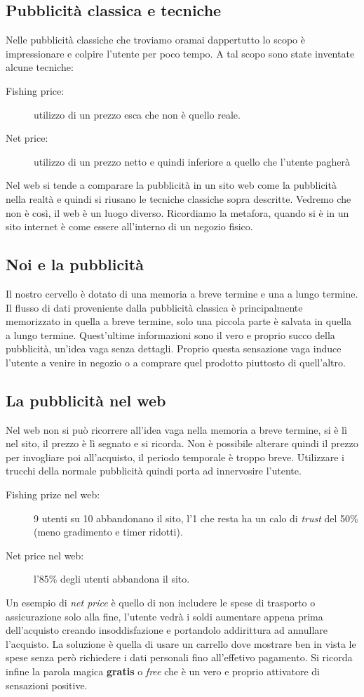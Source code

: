 		\subsection{Pubblicità classica e tecniche}
			Nelle pubblicità classiche che troviamo oramai dappertutto lo scopo è impressionare e colpire l'utente per poco tempo. A tal scopo sono state inventate alcune tecniche:
			\begin{description}
				\item[Fishing price:] utilizzo di un prezzo esca che non è quello reale.
				\item[Net price:] utilizzo di un prezzo netto e quindi inferiore a quello che l'utente pagherà
			\end{description}
			Nel web si tende a comparare la pubblicità in un sito web come la pubblicità nella realtà e quindi si riusano le tecniche classiche sopra descritte. Vedremo che non è così, il web è un luogo diverso. Ricordiamo la metafora, quando si è in un sito internet è come essere all'interno di un negozio fisico.
		
		\subsection{Noi e la pubblicità}
			Il nostro cervello è dotato di una memoria a breve termine e una a lungo termine. Il flusso di dati proveniente dalla pubblicità classica è principalmente memorizzato in quella a breve termine, solo una piccola parte è salvata in quella a lungo termine. Quest'ultime informazioni sono il vero e proprio succo della pubblicità, un'idea vaga senza dettagli. Proprio questa sensazione vaga induce l'utente a venire in negozio o a comprare quel prodotto piuttosto di quell'altro.
		
		\subsection{La pubblicità nel web}
			Nel web non si può ricorrere all'idea vaga nella memoria a breve termine, si è lì nel sito, il prezzo è lì segnato e si ricorda. Non è possibile alterare quindi il prezzo per invogliare poi all'acquisto, il periodo temporale è troppo breve. Utilizzare i trucchi della normale pubblicità 		 quindi porta ad innervosire l'utente.
			\begin{description}
				\item[Fishing prize nel web:] 9 utenti su 10 abbandonano il sito, l'1 che resta ha un calo di \emph{trust} del 50\% (meno gradimento e timer ridotti).
				\item[Net price nel web:] l'85\% degli utenti abbandona il sito. 
			\end{description}
			Un esempio di \emph{net price} è quello di non includere le spese di trasporto o assicurazione solo alla fine, l'utente vedrà i soldi aumentare appena prima dell'acquisto creando insoddisfazione e portandolo addirittura ad annullare l'acquisto. La soluzione è quella di usare un carrello dove mostrare ben in vista le spese senza però richiedere i dati personali fino all'effetivo pagamento.
			Si ricorda infine la parola magica \textbf{gratis} o \emph{free} che è un vero e proprio attivatore di sensazioni positive.
			
